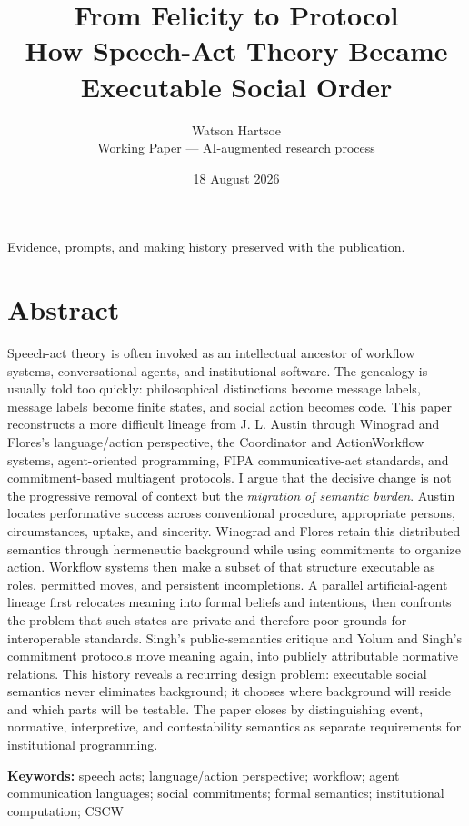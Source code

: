 \documentclass[11pt]{article}
\title{\textbf{From Felicity to Protocol}\\\large How Speech-Act Theory Became Executable Social Order}
\author{Watson Hartsoe\\\small Working Paper --- AI-augmented research process}
\date{18 August 2026}
\begin{document}
\maketitle
\noindent\small Evidence, prompts, and making history preserved with the publication.\normalsize\par

\section*{Abstract}
Speech-act theory is often invoked as an intellectual ancestor of workflow systems, conversational agents, and institutional software. The genealogy is usually told too quickly: philosophical distinctions become message labels, message labels become finite states, and social action becomes code. This paper reconstructs a more difficult lineage from J. L. Austin through Winograd and Flores's language/action perspective, the Coordinator and ActionWorkflow systems, agent-oriented programming, FIPA communicative-act standards, and commitment-based multiagent protocols. I argue that the decisive change is not the progressive removal of context but the \emph{migration of semantic burden}. Austin locates performative success across conventional procedure, appropriate persons, circumstances, uptake, and sincerity. Winograd and Flores retain this distributed semantics through hermeneutic background while using commitments to organize action. Workflow systems then make a subset of that structure executable as roles, permitted moves, and persistent incompletions. A parallel artificial-agent lineage first relocates meaning into formal beliefs and intentions, then confronts the problem that such states are private and therefore poor grounds for interoperable standards. Singh's public-semantics critique and Yolum and Singh's commitment protocols move meaning again, into publicly attributable normative relations. This history reveals a recurring design problem: executable social semantics never eliminates background; it chooses where background will reside and which parts will be testable. The paper closes by distinguishing event, normative, interpretive, and contestability semantics as separate requirements for institutional programming.\par

\textbf{Keywords:} speech acts; language/action perspective; workflow; agent communication languages; social commitments; formal semantics; institutional computation; CSCW\par
\end{document}
